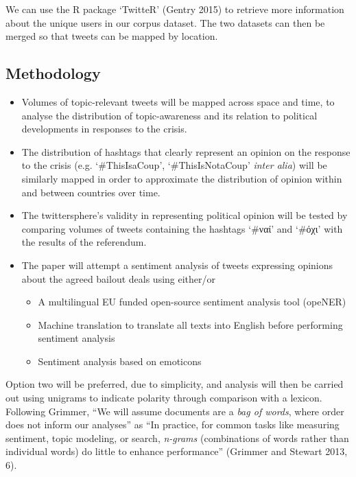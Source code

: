 \documentclass[]{article}
\begin{document}
We can use the R package `TwitteR' (Gentry 2015) to retrieve more
information about the unique users in our corpus dataset. The two
datasets can then be merged so that tweets can be mapped by location.

\subsection{Methodology}\label{methodology}

\begin{itemize}
\item
  Volumes of topic-relevant tweets will be mapped across space and time,
  to analyse the distribution of topic-awareness and its relation to
  political developments in responses to the crisis.
\item
  The distribution of hashtags that clearly represent an opinion on the
  response to the crisis (e.g. `\#ThisIsaCoup', `\#ThisIsNotaCoup'
  \emph{inter alia}) will be similarly mapped in order to approximate
  the distribution of opinion within and between countries over time.
\item
  The twittersphere's validity in representing political opinion will be
  tested by comparing volumes of tweets containing the hashtags `\#ναί'
  and `\#όχι' with the results of the referendum.
\item
  The paper will attempt a sentiment analysis of tweets expressing
  opinions about the agreed bailout deals using either/or

  \begin{itemize}
  \item
    A multilingual EU funded open-source sentiment analysis tool
    (opeNER)
  \item
    Machine translation to translate all texts into English before
    performing sentiment analysis
  \item
    Sentiment analysis based on emoticons
  \end{itemize}
\end{itemize}

Option two will be preferred, due to simplicity, and analysis will then
be carried out using unigrams to indicate polarity through comparison
with a lexicon. Following Grimmer, ``We will assume documents are a
\emph{bag of words}, where order does not inform our analyses'' as ``In
practice, for common tasks like measuring sentiment, topic modeling, or
search, \emph{n-grams} (combinations of words rather than individual
words) do little to enhance performance'' (Grimmer and Stewart 2013, 6).
\end{document}
